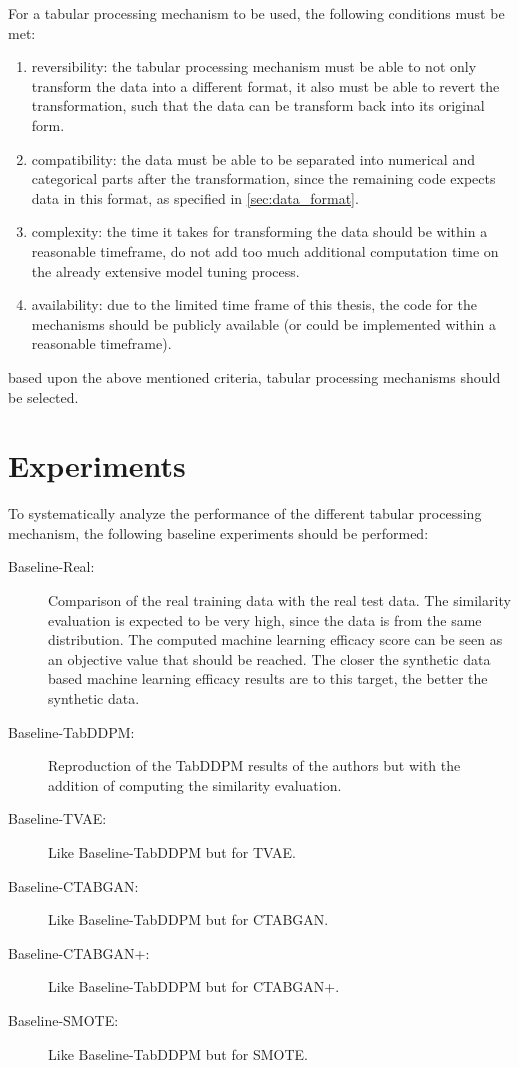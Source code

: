 For a tabular processing mechanism to be used, the following conditions must be met:

\begin{enumerate}
    \item reversibility: the tabular processing mechanism must be able to not only transform the data into a different format, it also must be able to revert the transformation,
    such that the data can be transform back into its original form.
    \item compatibility: the data must be able to be separated into numerical and categorical parts after the transformation,
    since the remaining code expects data in this format, as specified in \autoref{sec:data_format}.
    \item complexity: the time it takes for transforming the data should be within a reasonable timeframe, do not add too much additional computation time on the already extensive model tuning process.
    \item availability: due to the limited time frame of this thesis, the code for the mechanisms should be publicly available (or could be implemented within a reasonable timeframe).
\end{enumerate}

based upon the above mentioned criteria, tabular processing mechanisms should be selected.

\section{Experiments}
\label{ch:conceptualDesign-Experiments}

To systematically analyze the performance of the different tabular processing mechanism, the following baseline experiments should be performed:

\begin{description}
    \item[Baseline-Real:] Comparison of the real training data with the real test data. 
    The similarity evaluation is expected to be very high, since the data is from the same distribution.
    The computed machine learning efficacy score can be seen as an objective value that should be reached.
    The closer the synthetic data based machine learning efficacy results are to this target, the better the synthetic data.
    \item[Baseline-TabDDPM:] Reproduction of the TabDDPM results of the authors \cite{kotelnikov2022TabDDPMModellingTabular} but with the addition of computing the similarity evaluation.
    \item[Baseline-TVAE:] Like Baseline-TabDDPM but for TVAE.
    \item[Baseline-CTABGAN:] Like Baseline-TabDDPM but for CTABGAN.
    \item[Baseline-CTABGAN+:] Like Baseline-TabDDPM but for CTABGAN+.
    \item[Baseline-SMOTE:] Like Baseline-TabDDPM but for SMOTE.
\end{description}

